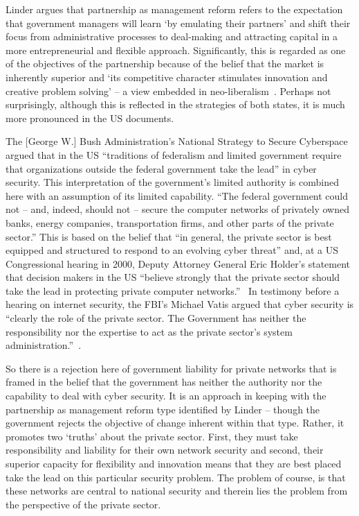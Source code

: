 \documentclass[a4paper,11pt]{article}
\begin{document}
Linder argues that partnership as management reform refers to the
expectation that government managers will learn `by emulating their
partners' and shift their focus from administrative processes to
deal-making and attracting capital in a more entrepreneurial and
flexible approach. Significantly, this is regarded as one of the
objectives of the partnership because of the belief that the market is
inherently superior and `its competitive character stimulates
innovation and creative problem solving' -- a view embedded in
neo-liberalism~\cite{linder:1999}. Perhaps not surprisingly, although
this is reflected in the strategies of both states, it is much more
pronounced in the US documents.

The [George W.] Bush Administration’s National Strategy to Secure
Cyberspace~\cite{gwbush:2003} argued that in the US ``traditions of
federalism and limited government require that organizations outside
the federal government take the lead'' in cyber security.  This
interpretation of the government's limited authority is combined here
with an assumption of its limited capability. ``The federal government
could not -- and, indeed, should not -- secure the computer networks
of privately owned banks, energy companies, transportation firms, and
other parts of the private sector.''  This is based on the belief that
``in general, the private sector is best equipped and structured to
respond to an evolving cyber threat'' and, at a US Congressional
hearing in 2000, Deputy Attorney General Eric Holder’s statement that
decision makers in the US ``believe strongly that the private sector
should take the lead in protecting private computer
networks.''~\cite{holder:2000} In testimony before a hearing on
internet security, the FBI's Michael Vatis argued that cyber security
is ``clearly the role of the private sector. The Government has
neither the responsibility nor the expertise to act as the private
sector’s system administration.''~\cite{vatis:2000}.

So there is a rejection here of government liability for private
networks that is framed in the belief that the government has neither
the authority nor the capability to deal with cyber security. It is an
approach in keeping with the partnership as management reform type
identified by Linder -- though the government rejects the objective of
change inherent within that type. Rather, it promotes two `truths'
about the private sector. First, they must take responsibility and
liability for their own network security and second, their superior
capacity for flexibility and innovation means that they are best
placed take the lead on this particular security problem. The problem
of course, is that these networks are central to national security and
therein lies the problem from the perspective of the private sector.
\end{document}
